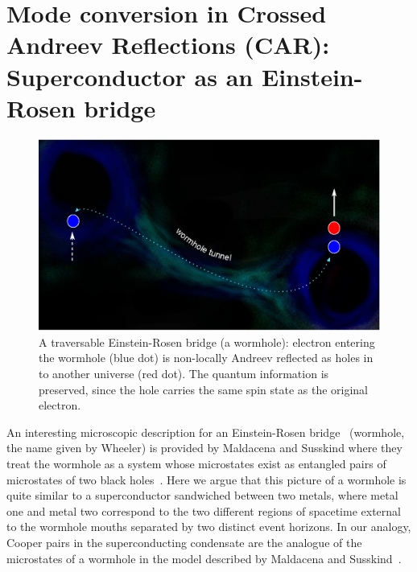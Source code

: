 \documentclass[10pt,letterpaper,aps,onecolumn,superscriptaddress,floatfix,notitlepage]{revtex4-1}
\begin{document}
	\section{Mode conversion in Crossed Andreev Reflections (CAR): Superconductor as an Einstein-Rosen bridge\label{sec4}}
	\begin{figure}
		\includegraphics[scale=0.6]{fig5.eps}
		\caption{A traversable Einstein-Rosen bridge (a wormhole): electron entering the wormhole (blue dot) is non-locally Andreev reflected as holes in to another universe (red dot). The quantum information is preserved, since the hole carries the same spin state as the original electron.\label{cosmos2}}
	\end{figure}
	
	An interesting microscopic description for an Einstein-Rosen bridge~\cite{einstein1935particle} (wormhole, the name given by Wheeler) is provided by Maldacena and Susskind where they treat the wormhole as a system whose microstates exist as entangled pairs of microstates of two black holes~\cite{wepr}. Here we argue that this picture of a wormhole is quite similar to a superconductor sandwiched between two metals, where metal one and metal two correspond to the two different regions of spacetime external to the wormhole mouths separated by two distinct event horizons. In our analogy, Cooper pairs in the superconducting condensate are the analogue of the microstates of a wormhole in the model described by Maldacena and Susskind~\cite{wepr}.
	
\end{document}
